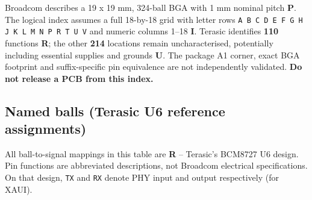 \documentclass[10pt,a4paper]{article}
\newcommand{\m}[1]{\textsf{\color{blue}\bfseries #1}}
\newcommand{\unk}{\textsf{\color{amber}\bfseries U}}
\begin{document}
Broadcom describes a 19 x 19 mm, 324-ball BGA with 1 mm nominal pitch \m{P}. The logical index assumes a full 18-by-18 grid with letter rows \texttt{A B C D E F G H J K L M N P R T U V} and numeric columns 1--18 \m{I}. Terasic identifies \textbf{110} functions \m{R}; the other \textbf{214} locations remain uncharacterised, potentially including essential supplies and grounds \unk. The package A1 corner, exact BGA footprint and suffix-specific pin equivalence are not independently validated. \textbf{Do not release a PCB from this index.}
\subsection{Named balls (Terasic U6 reference assignments)}
All ball-to-signal mappings in this table are \m{R} -- Terasic's BCM8727 U6 design. Pin functions are abbreviated descriptions, not Broadcom electrical specifications. On that design, \texttt{TX} and \texttt{RX} denote PHY input and output respectively (for XAUI).
\small
\end{document}
